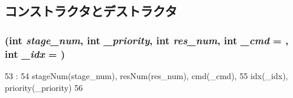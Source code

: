 \subsection{コンストラクタとデストラクタ}
\hypertarget{classScheduleEntry_a39f5765d7267f4eed1690e3c3476d2ef}{
\subsubsection[{ScheduleEntry}]{ (int {\em stage\_\-num}, \/  int {\em \_\-priority}, \/  int {\em res\_\-num}, \/  int {\em \_\-cmd} = {}, \/  int {\em \_\-idx} = {})}}
\label{classScheduleEntry_a39f5765d7267f4eed1690e3c3476d2ef}



\begin{DoxyCode}
53                                 :
54         stageNum(stage_num), resNum(res_num), cmd(_cmd),
55         idx(_idx), priority(_priority)
56     { }

\end{DoxyCode}


